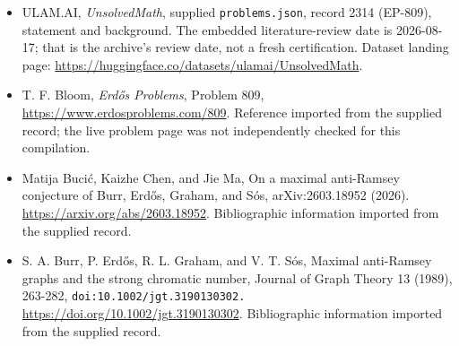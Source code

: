 \documentclass[11pt,a4paper]{article}
\begin{document}
{\small

\begin{itemize}

\item[\hypertarget{source:2314:1}{S1}] ULAM.AI, \emph{UnsolvedMath}, supplied \texttt{problems.json}, record 2314 (EP-809), statement and background. The embedded literature-review date is 2026-08-17; that is the archive’s review date, not a fresh certification. Dataset landing page: \url{https://huggingface.co/datasets/ulamai/UnsolvedMath}.

\item[\hypertarget{source:2314:2}{S2}] T. F. Bloom, \emph{Erdős Problems}, Problem 809, \url{https://www.erdosproblems.com/809}. Reference imported from the supplied record; the live problem page was not independently checked for this compilation.

\item[\hypertarget{source:2314:3}{S3}] Matija Bucić, Kaizhe Chen, and Jie Ma, On a maximal anti-Ramsey conjecture of Burr, Erdős, Graham, and Sós, arXiv:2603.18952 (2026). \url{https://arxiv.org/abs/2603.18952}. Bibliographic information imported from the supplied record.

\item[\hypertarget{source:2314:4}{S4}] S. A. Burr, P. Erdős, R. L. Graham, and V. T. Sós, Maximal anti-Ramsey graphs and the strong chromatic number, Journal of Graph Theory 13 (1989), 263-282, \nolinkurl{doi:10.1002/jgt.3190130302.} \url{https://doi.org/10.1002/jgt.3190130302}. Bibliographic information imported from the supplied record.

\end{itemize}

}

\label{end:2314}
\end{document}

